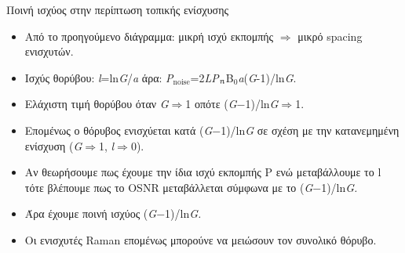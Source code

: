 \documentclass[11pt,aspectratio=169]{beamer}
\begin{document}
\begin{frame}[shrink=20,t]{Ποινή ισχύος στην περίπτωση τοπικής ενίσχυσης}
\begin{itemize}
\item Από το προηγούμενο διάγραμμα: μικρή ισχύ εκπομπής \ensuremath{\Rightarrow} μικρό spacing ενισχυτών.
\item Ισχύς θορύβου: \textit{l}=ln\textit{G}/\textit{a} άρα: \textit{P}$_{\text{noise}}$=2\textit{LP}$_{\text{\textit{n}}}$B$_{\text{0}}$\textit{a}(\textit{G}-1)/ln\textit{G}.
\item Ελάχιστη τιμή θορύβου όταν \textit{G}\ensuremath{\Rightarrow}1 οπότε (\textit{G}\ensuremath{-}1)/ln\textit{G}\ensuremath{\Rightarrow}1.
\item Επομένως ο θόρυβος ενισχύεται κατά (\textit{G}\ensuremath{-}1)/ln\textit{G}\textit{ }σε σχέση με την κατανεμημένη ενίσχυση (\textit{G}\ensuremath{\Rightarrow}1, \textit{l}\ensuremath{\Rightarrow}0).
\item Αν θεωρήσουμε πως έχουμε την ίδια ισχύ εκπομπής P ενώ μεταβάλλουμε το l τότε βλέπουμε πως το OSNR μεταβάλλεται σύμφωνα με το (\textit{G}\ensuremath{-}1)/ln\textit{G}\textit{.}
\item Άρα έχουμε ποινή ισχύος (\textit{G}\ensuremath{-}1)/ln\textit{G}\textit{.}
\item Οι ενισχυτές Raman επομένως μπορούνε να μειώσουν τον συνολικό θόρυβο.
\end{itemize}
\end{frame}
\end{document}
